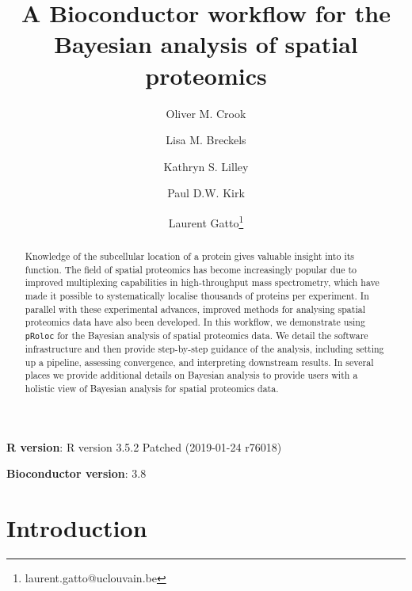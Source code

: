 \documentclass[9pt,a4paper,]{extarticle}
\begin{document}
\pagestyle{front}

\title{A Bioconductor workflow for the Bayesian analysis of spatial proteomics}

\author[1,2]{Oliver M. Crook}
\author[1]{Lisa M. Breckels}
\author[1]{Kathryn S. Lilley}
\author[2]{Paul D.W. Kirk}
\author[3]{Laurent Gatto\thanks{\ttfamily laurent.gatto@uclouvain.be}}

\maketitle
\thispagestyle{front}

\begin{abstract}
Knowledge of the subcellular location of a protein gives valuable insight into its function. The field of spatial proteomics has become increasingly popular due to improved multiplexing capabilities in high-throughput mass spectrometry, which have made it possible to systematically localise thousands of proteins per experiment. In parallel with these experimental advances, improved methods for analysing spatial proteomics data have also been developed. In this workflow, we demonstrate using \texttt{pRoloc} for the Bayesian analysis of spatial proteomics data. We detail the software infrastructure and then provide step-by-step guidance of the analysis, including setting up a pipeline, assessing convergence, and interpreting downstream results. In several places we provide additional details on Bayesian analysis to provide users with a holistic view of Bayesian analysis for spatial proteomics data.
\end{abstract}


\clearpage
\pagestyle{main}

\newcommand{\diag}{\mathop{\mathrm{diag}}}

\textbf{R version}: R version 3.5.2 Patched (2019-01-24 r76018)

\textbf{Bioconductor version}: 3.8

\hypertarget{introduction}{%
\section{Introduction}\label{introduction}}
\end{document}
